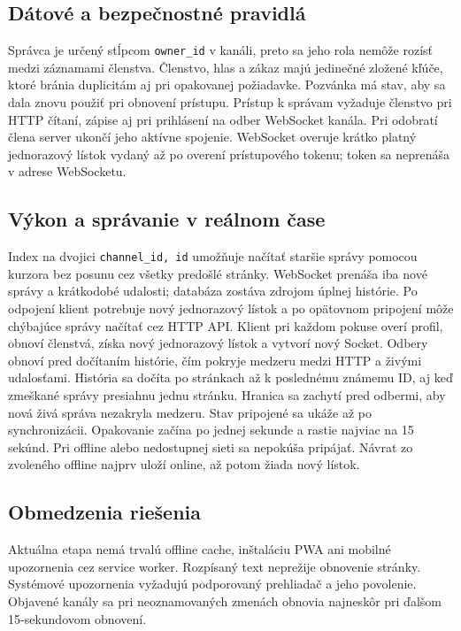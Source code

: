 \documentclass[11pt,a4paper]{article}
\begin{document}
\subsection{Dátové a bezpečnostné pravidlá}
Správca je určený stĺpcom \texttt{owner\_id} v kanáli, preto sa jeho rola
nemôže rozísť medzi záznamami členstva. Členstvo, hlas a zákaz majú
jedinečné zložené kľúče, ktoré bránia duplicitám aj pri opakovanej
požiadavke. Pozvánka má stav, aby sa dala znovu použiť pri obnovení
prístupu. Prístup k správam vyžaduje členstvo pri HTTP čítaní, zápise aj
pri prihlásení na odber WebSocket kanála. Pri odobratí člena server
ukončí jeho aktívne spojenie. WebSocket overuje krátko platný jednorazový
lístok vydaný až po overení prístupového tokenu; token sa neprenáša v
adrese WebSocketu.

\subsection{Výkon a správanie v reálnom čase}
Index na dvojici \texttt{channel\_id, id} umožňuje načítať staršie správy
pomocou kurzora bez posunu cez všetky predošlé stránky. WebSocket prenáša
iba nové správy a krátkodobé udalosti; databáza zostáva zdrojom úplnej
histórie. Po odpojení klient potrebuje nový jednorazový lístok a po
opätovnom pripojení môže chýbajúce správy načítať cez HTTP API.
Klient pri každom pokuse overí profil, obnoví členstvá, získa nový
jednorazový lístok a vytvorí nový Socket. Odbery obnoví pred dočítaním
histórie, čím pokryje medzeru medzi HTTP a živými udalosťami. História
sa dočíta po stránkach až k poslednému známemu ID, aj keď zmeškané správy
presiahnu jednu stránku. Hranica sa zachytí pred odbermi, aby nová živá
správa nezakryla medzeru. Stav pripojené sa ukáže až po synchronizácii.
Opakovanie začína po jednej sekunde a rastie najviac na 15 sekúnd.
Pri offline alebo nedostupnej sieti sa nepokúša pripájať. Návrat zo
zvoleného offline najprv uloží online, až potom žiada nový lístok.

\subsection{Obmedzenia riešenia}
Aktuálna etapa nemá trvalú offline cache, inštaláciu PWA ani mobilné
upozornenia cez service worker. Rozpísaný text neprežije obnovenie stránky.
Systémové upozornenia vyžadujú podporovaný prehliadač a jeho povolenie.
Objavené kanály sa pri neoznamovaných zmenách obnovia najneskôr pri
ďalšom 15-sekundovom obnovení.
\end{document}
